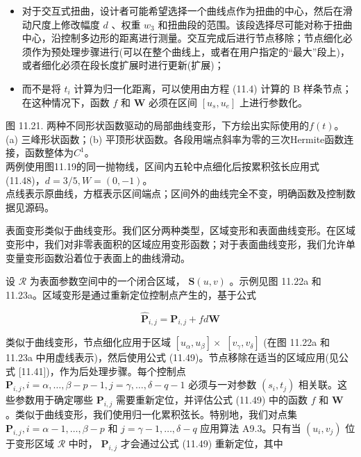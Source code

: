 \documentclass[../main.tex]{subfiles}
\begin{document}
\begin{itemize}
\item 对于交互式扭曲，设计者可能希望选择一个曲线点作为扭曲的中心，然后在滑动尺度上修改幅度 \(d\) 、权重 \({w}_{3}\) 和扭曲段的范围。该段选择尽可能对称于扭曲中心，沿控制多边形的距离进行测量。交互完成后进行节点移除；节点细化必须作为预处理步骤进行(可以在整个曲线上，或者在用户指定的“最大”段上)，或者细化必须在段长度扩展时进行更新(扩展)；
\end{itemize}

\begin{itemize}
\item 而不是将 \({t}_{i}\) 计算为归一化距离，可以使用由方程 (11.4) 计算的 B 样条节点；在这种情况下，函数 \(f\) 和 \(\mathbf{W}\) 必须在区间 \(\left\lbrack  {{u}_{s},{u}_{e}}\right\rbrack\) 上进行参数化。
\end{itemize}

\begin{center}
\begin{minipage}{37cm}
\centering
{}
\par\smallskip
图 11.21. 两种不同形状函数驱动的局部曲线变形，下方绘出实际使用的$f(t)$。\\
(a) 三峰形状函数；(b) 平顶形状函数。各段用端点斜率为零的三次Hermite函数连接，函数整体为$C^1$。\\
两例使用图11.19的同一抛物线，区间内五轮中点细化后按累积弦长应用式(11.48)，$d=3/5,W=(0,-1)$。\\
点线表示原曲线，方框表示区间端点；区间外的曲线完全不变，明确函数及控制数据见源码。
\end{minipage}
\end{center}

表面变形类似于曲线变形。我们区分两种类型，区域变形和表面曲线变形。在区域变形中，我们对非零表面积的区域应用变形函数；对于表面曲线变形，我们允许单变量变形函数沿着位于表面上的曲线滑动。



设 \(\mathcal{R}\) 为表面参数空间中的一个闭合区域， \(\mathbf{S}\left( {u,v}\right)\) 。示例见图 11.22a 和 11.23a。区域变形是通过重新定位控制点产生的，基于公式

\[
{\widehat{\mathbf{P}}}_{i,j} = {\mathbf{P}}_{i,j} + {fd}\mathbf{W} \tag{11.49}
\]

类似于曲线变形，节点细化应用于区域 \(\left\lbrack  {{u}_{\alpha },{u}_{\beta }}\right\rbrack   \times\)  \(\left\lbrack  {{v}_{\gamma },{v}_{\delta }}\right\rbrack\) (在图 11.22a 和 11.23a 中用虚线表示)，然后使用公式 (11.49)。节点移除在适当的区域应用(见公式 [11.41])，作为后处理步骤。每个控制点 \({\mathbf{P}}_{i,j},i = \alpha ,\ldots ,\beta  - p - 1,j = \gamma ,\ldots ,\delta  - q - 1\) 必须与一对参数 \(\left( {{s}_{i},{t}_{j}}\right)\) 相关联。这些参数用于确定哪些 \({\mathbf{P}}_{i,j}\) 需要重新定位，并评估公式 (11.49) 中的函数 \(f\) 和 \(\mathbf{W}\) 。类似于曲线变形，我们使用归一化累积弦长。特别地，我们对点集 \({\mathbf{P}}_{i,j},i = \alpha  - 1,\ldots ,\beta  - p\) 和 \(j = \gamma  - 1,\ldots ,\delta  - q\) 应用算法 A9.3。只有当 \(\left( {{u}_{i},{v}_{j}}\right)\) 位于变形区域 \(\mathcal{R}\) 中时， \({\mathbf{P}}_{i,j}\) 才会通过公式 (11.49) 重新定位，其中
\end{document}

